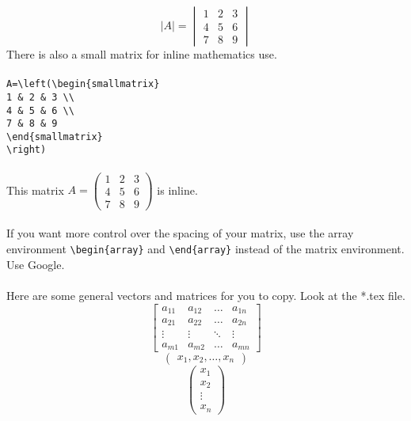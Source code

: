 \documentclass[12pt]{article}
\theoremstyle{definition}
\begin{document}
\[
\vert A \vert=
\begin{vmatrix}
1 & 2 & 3 \\
4 & 5 & 6 \\
7 & 8 & 9
\end{vmatrix}
\]
\newpage
\noindent %
There is also a small matrix for inline mathematics use.\\ \\
\verb!A=\left(\begin{smallmatrix}!\\
\verb!1 & 2 & 3 \\!\\
\verb!4 & 5 & 6 \\!\\
\verb!7 & 8 & 9!\\
\verb!\end{smallmatrix}!\\
\verb!\right)!\\ \\
This matrix
$A=\left(\begin{smallmatrix}
1 & 2 & 3 \\
4 & 5 & 6 \\
7 & 8 & 9
\end{smallmatrix}
\right)$
is inline.\\ \\
If you want more control over the spacing of your matrix, use the array environment \verb!\begin{array}! and \verb!\end{array}! instead of the matrix environment. Use Google.\\ \\
Here are some general vectors and matrices for you to copy. Look at the *.tex file.
\[
\begin{bmatrix}
a_{11} & a_{12} & \dots   & a_{1n}\\
a_{21} & a_{22} & \dots   & a_{2n}\\
\vdots  & \vdots    & \ddots & \vdots \\
a_{m1} & a_{m2} & \dots  & a_{mn}
\end{bmatrix}
\]
\[
\begin{pmatrix}
x_{1},x_{2},\dots,x_{n}
\end{pmatrix}
\]
\[
\begin{pmatrix}
x_{1}\\
x_{2}\\
\vdots\\
x_{n}
\end{pmatrix}
\]
\newpage
\noindent
\end{document}
